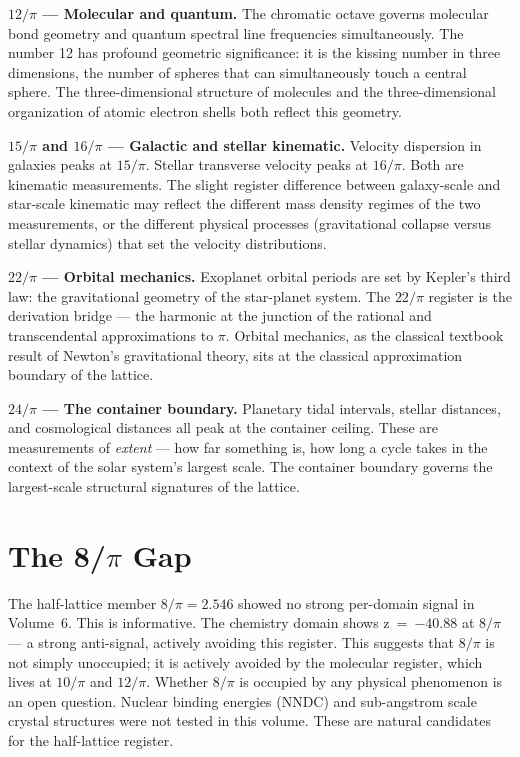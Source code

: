 \documentclass[11pt, letterpaper, openany]{book}
\begin{document}
\textbf{$12/\pi$ --- Molecular and quantum.}
The chromatic octave governs molecular bond geometry and quantum spectral line frequencies simultaneously.
The number 12 has profound geometric significance: it is the kissing number in three dimensions, the number of spheres that can simultaneously touch a central sphere.
The three-dimensional structure of molecules and the three-dimensional organization of atomic electron shells both reflect this geometry.

\textbf{$15/\pi$ and $16/\pi$ --- Galactic and stellar kinematic.}
Velocity dispersion in galaxies peaks at $15/\pi$. Stellar transverse velocity peaks at $16/\pi$.
Both are kinematic measurements. The slight register difference between galaxy-scale and star-scale kinematic may reflect the different mass density regimes of the two measurements, or the different physical processes (gravitational collapse versus stellar dynamics) that set the velocity distributions.

\textbf{$22/\pi$ --- Orbital mechanics.}
Exoplanet orbital periods are set by Kepler's third law: the gravitational geometry of the star-planet system.
The $22/\pi$ register is the derivation bridge --- the harmonic at the junction of the rational and transcendental approximations to $\pi$.
Orbital mechanics, as the classical textbook result of Newton's gravitational theory, sits at the classical approximation boundary of the lattice.

\textbf{$24/\pi$ --- The container boundary.}
Planetary tidal intervals, stellar distances, and cosmological distances all peak at the container ceiling.
These are measurements of \emph{extent} --- how far something is, how long a cycle takes in the context of the solar system's largest scale.
The container boundary governs the largest-scale structural signatures of the lattice.

\section*{The 8/$\pi$ Gap}

The half-lattice member $8/\pi = 2.546$ showed no strong per-domain signal in Volume~6. This is informative.
The chemistry domain shows z~=~$-40.88$ at $8/\pi$ --- a strong anti-signal, actively avoiding this register.
This suggests that $8/\pi$ is not simply unoccupied; it is actively avoided by the molecular register, which lives at $10/\pi$ and $12/\pi$.
Whether $8/\pi$ is occupied by any physical phenomenon is an open question.
Nuclear binding energies (NNDC) and sub-angstrom scale crystal structures were not tested in this volume.
These are natural candidates for the half-lattice register.
\end{document}
